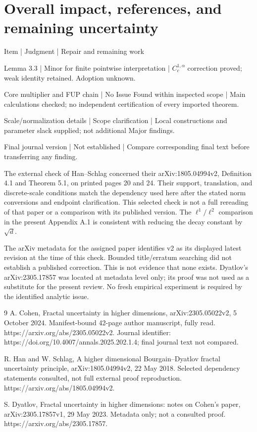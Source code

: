 \documentclass[10pt]{article}
\begin{document}
\section*{Overall impact, references, and remaining uncertainty}
Item | Judgment | Repair and remaining work\par
Lemma 3.3 | Minor for finite pointwise interpretation | \(C^{1,\alpha}_c\) correction proved; weak identity retained. Adoption unknown.\par
Core multiplier and FUP chain | No Issue Found within inspected scope | Main calculations checked; no independent certification of every imported theorem.\par
Scale/normalization details | Scope clarification | Local constructions and parameter slack supplied; not additional Major findings.\par
Final journal version | Not established | Compare corresponding final text before transferring any finding.\par
The external check of Han–Schlag concerned their arXiv:1805.04994v2, Definition 4.1 and Theorem 5.1, on printed pages 20 and 24. Their support, translation, and discrete-scale conditions match the dependency used here after the stated norm conversions and endpoint clarification. This selected check is not a full rereading of that paper or a comparison with its published version. The \(\ell^1/\ell^2\) comparison in the present Appendix A.1 is consistent with reducing the decay constant by \(\sqrt d\).\par
The arXiv metadata for the assigned paper identifies v2 as its displayed latest revision at the time of this check. Bounded title/erratum searching did not establish a published correction. This is not evidence that none exists. Dyatlov’s arXiv:2305.17857 was located at metadata level only; its proof was not used as a substitute for the present review. No fresh empirical experiment is required by the identified analytic issue.\par
9 A. Cohen, Fractal uncertainty in higher dimensions, arXiv:2305.05022v2, 5 October 2024. Manifest-bound 42-page author manuscript, fully read. https://arxiv.org/abs/2305.05022v2. Journal identifier: https://doi.org/10.4007/annals.2025.202.1.4; final journal text not compared.\par
R. Han and W. Schlag, A higher dimensional Bourgain–Dyatlov fractal uncertainty principle, arXiv:1805.04994v2, 22 May 2018. Selected dependency statements consulted, not full external proof reproduction. https://arxiv.org/abs/1805.04994v2.\par
S. Dyatlov, Fractal uncertainty in higher dimensions: notes on Cohen’s paper, arXiv:2305.17857v1, 29 May 2023. Metadata only; not a consulted proof. https://arxiv.org/abs/2305.17857.\par
\end{document}
